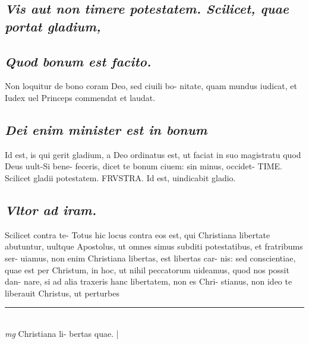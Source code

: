 \documentclass{article}
\begin{document}
\begin{pages}
\subsection*{\textit{Vis aut non timere potestatem. Scilicet, quae portat gladium, }}
{}
\subsection*{\textit{Quod bonum est facito. }}\pstart Non loquitur de bono coram Deo, sed ciuili bo- nitate, quam mundus iudicat, et Iudex uel Princeps commendat et laudat.  \pend
{}
{}
\subsection*{\textit{Dei enim minister est in bonum }}\pstart Id est, is qui gerit gladium, a Deo ordinatus est, ut faciat in suo magistratu quod Deus uult-Si bene- feceris, dicet te bonum ciuem: sin minus, occidet- TIME. Scilicet gladii potestatem. FRVSTRA.  Id est, uindicabit gladio.  \pend
{}
{}
\subsection*{\textit{Vltor ad iram. }}\pstart Scilicet contra te- Totus hic locus contra eos est, qui Christiana libertate abutuntur, uultque Apostolus, ut omnes simus subditi potestatibus, et fratribums ser- uiamus, non enim Christiana libertas, est libertas car- nis: sed conscientiae, quae est per Christum, in hoc, ut nihil peccatorum uideamus, quod nos possit dan- nare, si ad alia traxeris hanc libertatem, non es Chri- stianus, non ideo te liberauit Christus, ut perturbes  \pend
\vspace{0.5cm}\noindent
\vspace{0.2cm}\rule{1cm}{0.2pt}\\ 
\hspace{0.2cm}\textit{mg}
\footnotesize Christiana li- bertas quae.  
\normalsize| 
\endnumbering
\end{pages}
\end{document}
